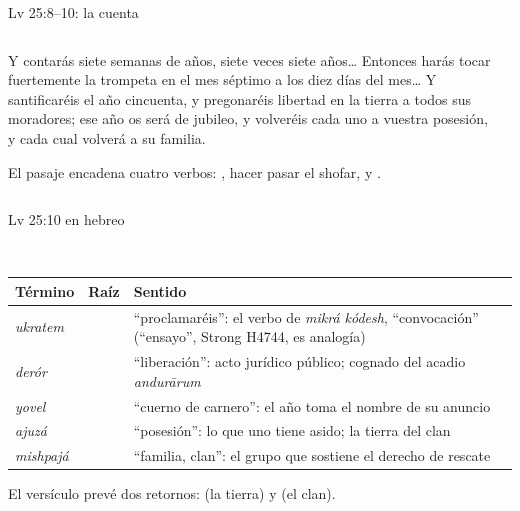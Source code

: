 \begin{frame}{Lv 25:8--10: la cuenta}
\begin{columns}[c,onlytextwidth]
\begin{column}{0.57\textwidth}
\begin{cita}Y contarás siete semanas de años, siete veces siete años\ldots{} Entonces harás tocar fuertemente la trompeta en el mes séptimo a los diez días del mes\ldots{} Y santificaréis el año cincuenta, y pregonaréis libertad en la tierra a todos sus moradores; ese año os será de jubileo, y volveréis cada uno a vuestra posesión, y cada cual volverá a su familia.\end{cita}
\scriptsize El pasaje encadena cuatro verbos: , hacer pasar el shofar,  y .
\end{column}
\begin{column}{0.41\textwidth}\end{column}
\end{columns}
\end{frame}

\begin{frame}{Lv 25:10 en hebreo}
\begin{center}
\\[2pt]
\end{center}
\renewcommand{\arraystretch}{1.12}\scriptsize
\begin{tabular}{@{}L{2.9cm}L{1.2cm}L{7.6cm}@{}}
\toprule
\textbf{Término} & \textbf{Raíz} & \textbf{Sentido} \\ \midrule
{} \emph{ukratem} &  & ``proclamaréis'': el verbo de \emph{mikrá kódesh}, ``convocación'' (``ensayo'', Strong H4744, es analogía) \\
 \emph{derór} &  & ``liberación'': acto jurídico público; cognado del acadio \emph{andurārum} \\
 \emph{yovel} &  & ``cuerno de carnero'': el año toma el nombre de su anuncio \\
 \emph{ajuzá} &  & ``posesión'': lo que uno tiene asido; la tierra del clan \\
 \emph{mishpajá} &  & ``familia, clan'': el grupo que sostiene el derecho de rescate \\
\bottomrule
\end{tabular}\par\smallskip
\small El versículo prevé dos retornos:  (la tierra) y  (el clan).
\end{frame}

